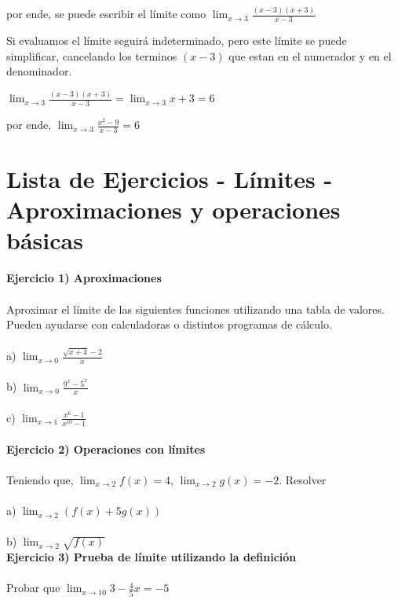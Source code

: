 \documentclass[11pt, a4paper]{article}
\begin{document}
{\begin{center}
    por ende, se puede escribir el l\'imite como {\color{blue} $\displaystyle \lim_{ x\to 3} \frac{(x-3)(x+3)}{x-3} $ } \\ \hfill 

    Si evaluamos el l\'imite seguir\'a indeterminado, pero este l\'imite se puede simplificar, cancelando los terminos $(x-3)$ que estan en el numerador y en el denominador.\\ \hfill

    {\color{blue} $\displaystyle \lim_{ x\to 3} \frac{(x-3)(x+3)}{x-3} = \lim_{ x\to 3} x + 3 = 6 $ } \\ \hfill 

    por ende, {\color{blue} $\displaystyle \lim_{ x\to 3} \frac{x^2-9}{x-3} = 6 $ }
\end{center}
\newpage
\section{ Lista de Ejercicios - L\'imites - Aproximaciones y operaciones b\'asicas }

\textbf{Ejercicio 1)  Aproximaciones } \\ \\
Aproximar el l\'imite de las siguientes funciones utilizando una tabla de valores. Pueden ayudarse con calculadoras o distintos programas de c\'alculo. \\ \\
a) $ \displaystyle  \lim_{x \to 0} \frac{ \sqrt{x+4} - 2 }{ x } $ \\ \\
b) $ \displaystyle  \lim_{x \to 0} \frac{ 9^x - 5^x }{ x } $ \\ \\
c) $ \displaystyle  \lim_{x \to 1} \frac{ x^6 - 1 }{ x^{10} - 1 } $ \\ \\

\textbf{ Ejercicio 2) Operaciones con l\'imites } \\ \\ 
Teniendo que, $ \displaystyle  \lim_{x \to 2} f(x) = 4  $, $ \displaystyle  \lim_{x \to 2} g(x) = -2  $. Resolver \\ \\ 
a) $ \displaystyle  \lim_{x \to 2} ( f(x) + 5g(x) )  $ \\ \\ 
b) $ \displaystyle  \lim_{x \to 2} \sqrt{ f(x) }  $ \\ 

\textbf{ Ejercicio 3) Prueba de l\'imite utilizando la definici\'on } \\ \\
Probar que $ \displaystyle  \lim_{x \to 10}  3 - \frac{4}{5}x = -5 $ \\ 

}
\end{document}
